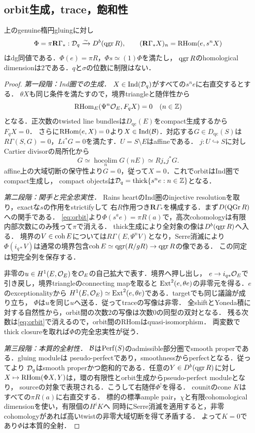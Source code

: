 \subsection{orbit生成，trace，飽和性}
\begin{theorem}[指定した自然導来切断の同値]\label{thm:derived}
上のgenuine楕円gluingに対し
\[
\Phi=\pi\mathbf R\Gamma_*:\mathcal D_q\xrightarrow{\sim}D^b(\operatorname{qgr} R),
\qquad (\mathbf R\Gamma_*X)_n=\operatorname{RHom}(e,s^nX)
\]
はdg同値である．$\Phi(e)=\pi R$，$\Phi s\simeq(1)\Phi$を満たし，
$\operatorname{qgr} R$のhomological dimensionは2である．$q$と$\sigma$の位数に制限はない．
\end{theorem}
\begin{proof}
\textit{第一段階：Ind圏での生成．}
$X\in\operatorname{Ind}(\mathcal D_q)$がすべての$s^ne$に右直交するとする．
$\theta X$も同じ条件を満たすので，境界triangleと随伴性から
\[
\operatorname{RHom}_E(\Psi^n\mathcal O_E,F_qX)=0\quad(n\in\mathbb Z)
\]
となる．正次数のtwisted line bundlesは$D_{\mathrm{qc}}(E)$をcompact生成するから$F_qX=0$．
さらに$\operatorname{RHom}(e,X)=0$より$X\in\operatorname{Ind}(\mathcal B)$．対応する$G\in D_{\mathrm{qc}}(S)$は
$R\Gamma(S,G)=0$，$Li^*G=0$を満たす．$U=S\setminus E$はaffineである．
$j:U\hookrightarrow S$に対しCartier divisorの局所化から
\[
G\simeq\operatorname*{hocolim}_{n}G(nE)\simeq Rj_*j^*G.
\]
affine上の大域切断の保守性より$G=0$，従って$X=0$．これでorbitはInd圏でcompact生成し，
compact objectsは$\mathcal D_q=\operatorname{thick}\{s^ne:n\in\mathbb Z\}$となる．

\textit{第二段階：関手と完全忠実性．}
Rains heartのInd圏のinjective resolutionを取り，exactな$s$の作用をstrictifyして
右$R$作用つき$\mathbf R\Gamma_*$を構成する．まず$D(\operatorname{QGr} R)$への関手である．
\eqref{eq:orbit}より$\Phi(s^ae)=\pi R(a)$で，高次cohomologyは有限内部次数にのみ残って$\pi$で消える．
thick生成により全対象の像は$D^b(\operatorname{qgr} R)$へ入る．
境界の$V\in\operatorname{coh} E$については$R\Gamma(E,\Psi^nV)$となり，Serre消滅により
$\Phi(i_{q*}V)$は通常の境界包含$\operatorname{coh} E\simeq\operatorname{qgr}(R/gR)\to\operatorname{qgr} R$の像である．
この同定は短完全列を保存する．

非零の$u\in H^1(E,\mathcal O_E)$を$\mathcal O_E$の自己拡大で表す．境界へ押し出し，
$e\to i_{q*}\mathcal O_E$で引き戻し，境界triangleのconnecting mapを取ると
$\operatorname{Ext}^2(e,\theta e)$の非零元を得る．$e$のexceptionalityから
$H^1(E,\mathcal O_E)\simeq\operatorname{Ext}^2(e,\theta e)$である．targetでも同じ議論が成り立ち，
$\Phi$は$u$を同じ$u$へ送る．従ってtraceの写像は非零．
全shiftとYoneda積に対する自然性から，orbit間の次数2の写像は次数0の同型の双対となる．
残る次数は\eqref{eq:orbit}で消えるので，orbit間のRHomはquasi-isomorphism．
両変数でthick closureを取れば$\Phi$の完全忠実性が従う．

\textit{第三段階：本質的全射性．}
$\mathcal B$は$\operatorname{Perf}(S)$のadmissible部分圏でsmooth properである．gluing moduleは
pseudo-perfectであり，smoothnessからperfectとなる．従って\cite[Theorems 3.18, 3.25]{Orlov}より
$\mathcal D_q$はsmooth properかつ飽和的である．任意の$Y\in D^b(\operatorname{qgr} R)$に対し
$X\mapsto\operatorname{RHom}(\Phi X,Y)$は，環の有限性とorbit生成からpseudo-perfect moduleとなり，
sourceの対象で表現される．こうして右随伴$\Phi^!$を得る．
counitのcone $K$はすべての$\pi R(a)$に右直交する．
標的の標準ample pair，$\chi$と有限cohomological dimensionを使い，有限個の$H^iK$へ
同時にSerre消滅を適用すると，非零cohomologyがあれば高いtwistの非零大域切断を得て矛盾する．
よって$K=0$であり$\Phi$は本質的全射．


\end{proof}
